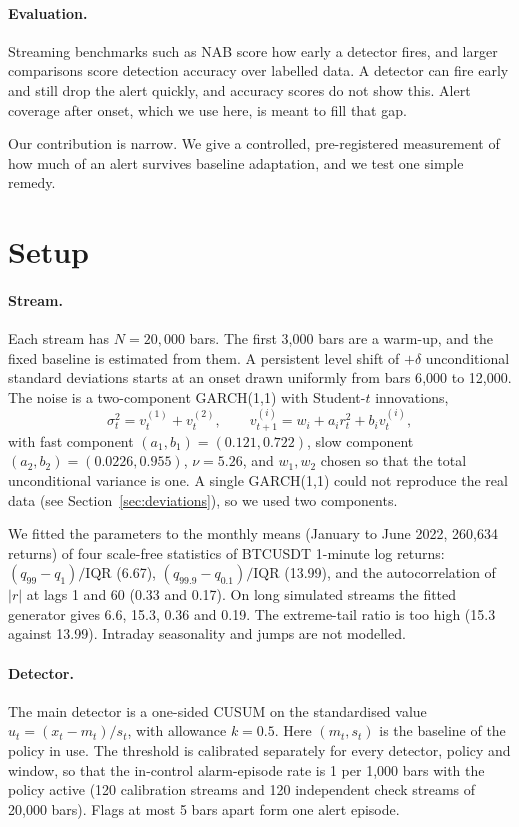 \documentclass[11pt]{article}
\begin{document}
\paragraph{Evaluation.} Streaming benchmarks such as NAB \cite{lavin2015nab} score how early a detector fires, and larger comparisons \cite{schmidl2022eval,boniol2024decade} score detection accuracy over labelled data. A detector can fire early and still drop the alert quickly, and accuracy scores do not show this. Alert coverage after onset, which we use here, is meant to fill that gap.

Our contribution is narrow. We give a controlled, pre-registered measurement of how much of an alert survives baseline adaptation, and we test one simple remedy.

\section{Setup}

\paragraph{Stream.} Each stream has $N=20{,}000$ bars. The first 3{,}000 bars are a warm-up, and the fixed baseline is estimated from them. A persistent level shift of $+\delta$ unconditional standard deviations starts at an onset drawn uniformly from bars 6{,}000 to 12{,}000. The noise is a two-component GARCH(1,1) \cite{bollerslev1986,engle1999} with Student-$t$ innovations,
\[
\sigma_t^2 = v^{(1)}_t + v^{(2)}_t,\qquad v^{(i)}_{t+1} = w_i + a_i r_t^2 + b_i v^{(i)}_t,
\]
with fast component $(a_1,b_1)=(0.121,0.722)$, slow component $(a_2,b_2)=(0.0226,0.955)$, $\nu=5.26$, and $w_1,w_2$ chosen so that the total unconditional variance is one. A single GARCH(1,1) could not reproduce the real data (see Section~\ref{sec:deviations}), so we used two components.

We fitted the parameters to the monthly means (January to June 2022, 260{,}634 returns) of four scale-free statistics of BTCUSDT 1-minute log returns: $(q_{99}-q_1)/\mathrm{IQR}$ (6.67), $(q_{99.9}-q_{0.1})/\mathrm{IQR}$ (13.99), and the autocorrelation of $|r|$ at lags 1 and 60 (0.33 and 0.17). On long simulated streams the fitted generator gives 6.6, 15.3, 0.36 and 0.19. The extreme-tail ratio is too high (15.3 against 13.99). Intraday seasonality and jumps are not modelled.

\paragraph{Detector.} The main detector is a one-sided CUSUM on the standardised value $u_t=(x_t-m_t)/s_t$, with allowance $k=0.5$. Here $(m_t,s_t)$ is the baseline of the policy in use. The threshold is calibrated separately for every detector, policy and window, so that the in-control alarm-episode rate is 1 per 1{,}000 bars with the policy active (120 calibration streams and 120 independent check streams of 20{,}000 bars). Flags at most 5 bars apart form one alert episode.
\end{document}
